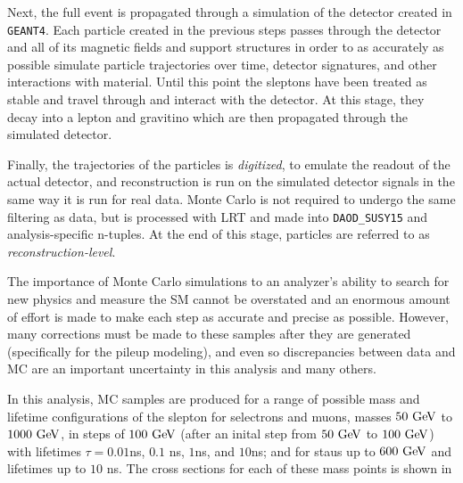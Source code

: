 Next, the full event is propagated through a simulation of the detector created in \texttt{GEANT4}. Each particle created in the previous steps passes through the detector and all of its magnetic fields and support structures in order to as accurately as possible simulate particle trajectories over time, detector signatures, and other interactions with material. Until this point the sleptons have been treated as stable and travel through and interact with the detector. At this stage, they decay into a lepton and gravitino which are then propagated through the simulated detector. 

Finally, the trajectories of the particles is \emph{digitized}, to emulate the readout of the actual detector, and reconstruction is run on the simulated detector signals in the same way it is run for real data. Monte Carlo is not required to undergo the same filtering as data, but is processed with \ac{LRT} and made into \texttt{DAOD\_SUSY15} and analysis-specific n-tuples. At the end of this stage, particles are referred to as \emph{reconstruction-level}. 

The importance of Monte Carlo simulations to an analyzer's ability to search for new physics and measure the \ac{SM} cannot be overstated and an enormous amount of effort is made to make each step as accurate and precise as possible. However, many corrections must be made to these samples after they are generated (specifically for the pileup modeling), and even so discrepancies between data and \ac{MC} are an important uncertainty in this analysis and many others.

In this analysis, \ac{MC} samples are produced for a range of possible mass and lifetime configurations of the slepton for selectrons and muons, masses $50 \GeV$ to $1000 \GeV$, in steps of $100 \GeV$ (after an inital step from $50 \GeV$ to $100 \GeV$) with lifetimes $\tau = 0.01$ns, $0.1$ ns, $1$ns, and $10$ns; and for staus up to $600 \GeV$ and lifetimes up to $10$ ns. The cross sections for each of these mass points is shown in 

